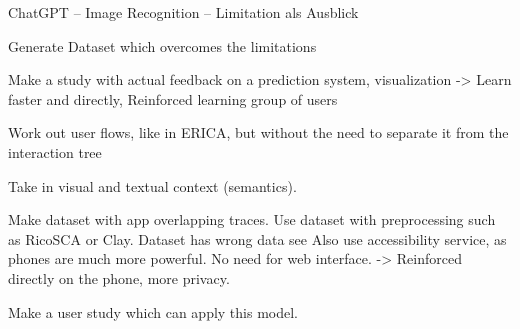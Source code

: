 ChatGPT – Image Recognition – Limitation als Ausblick

Generate Dataset which overcomes the limitations

Make a study with actual feedback on a prediction system, visualization
-> Learn faster and directly, Reinforced learning
group of users

Work out user flows, like in ERICA, but without the need to separate it from the interaction tree

Take in visual and textual context (semantics).

Make dataset with app overlapping traces.
Use dataset with preprocessing such as RicoSCA or Clay. Dataset has wrong data see \cite{clay}
Also use accessibility service, as phones are much more powerful.
No need for web interface.
-> Reinforced directly on the phone, more privacy.

Make a user study which can apply this model.
